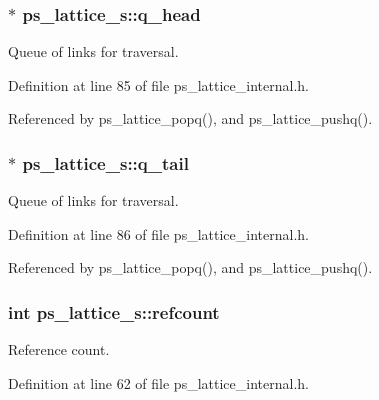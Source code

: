 \subsubsection[{q\-\_\-head}]{$\ast$ {\bf ps\-\_\-lattice\-\_\-s\-::q\-\_\-head}}\label{structps__lattice__s_a26c029189074db2f668d5a9d67eb7af5}


\-Queue of links for traversal. 



\-Definition at line 85 of file ps\-\_\-lattice\-\_\-internal.\-h.



\-Referenced by ps\-\_\-lattice\-\_\-popq(), and ps\-\_\-lattice\-\_\-pushq().

\subsubsection[{q\-\_\-tail}]{$\ast$ {\bf ps\-\_\-lattice\-\_\-s\-::q\-\_\-tail}}\label{structps__lattice__s_a5a9faf5e4aabd84a868d1bff97dd9814}


\-Queue of links for traversal. 



\-Definition at line 86 of file ps\-\_\-lattice\-\_\-internal.\-h.



\-Referenced by ps\-\_\-lattice\-\_\-popq(), and ps\-\_\-lattice\-\_\-pushq().

\subsubsection[{refcount}]{\setlength{\rightskip}{0pt plus 5cm}int {\bf ps\-\_\-lattice\-\_\-s\-::refcount}}\label{structps__lattice__s_a6d66b392dec016b3304da2f53be17dd1}


\-Reference count. 



\-Definition at line 62 of file ps\-\_\-lattice\-\_\-internal.\-h.



